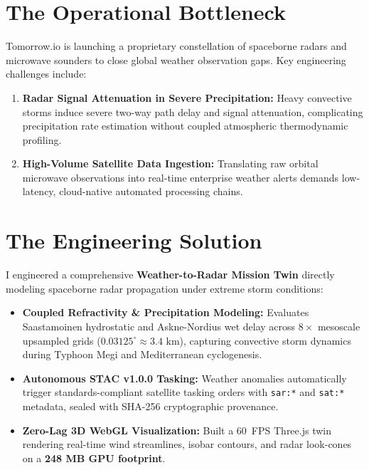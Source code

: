 \documentclass[10pt,letterpaper]{article}
\begin{document}
\noindent
\begin{minipage}[t]{0.51\textwidth}
    \section*{The Operational Bottleneck}
    \footnotesize
    Tomorrow.io is launching a proprietary constellation of spaceborne radars and microwave sounders to close global weather observation gaps. Key engineering challenges include:
    \begin{enumerate}[leftmargin=12pt,topsep=1pt,itemsep=1pt,parsep=0pt]
        \item \textbf{Radar Signal Attenuation in Severe Precipitation:} Heavy convective storms induce severe two-way path delay and signal attenuation, complicating precipitation rate estimation without coupled atmospheric thermodynamic profiling.
        \item \textbf{High-Volume Satellite Data Ingestion:} Translating raw orbital microwave observations into real-time enterprise weather alerts demands low-latency, cloud-native automated processing chains.
    \end{enumerate}

    \section*{The Engineering Solution}
    \footnotesize
    I engineered a comprehensive \textbf{Weather-to-Radar Mission Twin} directly modeling spaceborne radar propagation under extreme storm conditions:
    \begin{itemize}[leftmargin=12pt,topsep=1pt,itemsep=1pt,parsep=0pt]
        \item \textbf{Coupled Refractivity \& Precipitation Modeling:} Evaluates Saastamoinen hydrostatic and Askne-Nordius wet delay across $8\times$ mesoscale upsampled grids ($0.03125^\circ \approx 3.4\text{ km}$), capturing convective storm dynamics during Typhoon Megi and Mediterranean cyclogenesis.
        \item \textbf{Autonomous STAC v1.0.0 Tasking:} Weather anomalies automatically trigger standards-compliant satellite tasking orders with \texttt{sar:*} and \texttt{sat:*} metadata, sealed with SHA-256 cryptographic provenance.
        \item \textbf{Zero-Lag 3D WebGL Visualization:} Built a 60~FPS Three.js twin rendering real-time wind streamlines, isobar contours, and radar look-cones on a \textbf{248 MB GPU footprint}.
    \end{itemize}


\end{minipage}
\end{document}
